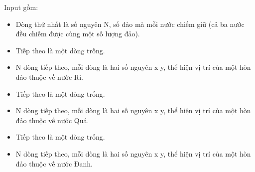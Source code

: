 Input gồm:  
\begin{itemize}
	\item     Dòng thứ nhất là số nguyên N, số đảo mà mỗi nước chiếm giữ (cả ba nước đều chiếm được cùng một số lượng đảo).   
	\item     Tiếp theo là một dòng trống.   
	\item     N dòng tiếp theo, mỗi dòng là hai số nguyên x y, thể hiện vị trí của một hòn đảo thuộc về nước Rỉ.   
	\item     Tiếp theo là một dòng trống.   
	\item     N dòng tiếp theo, mỗi dòng là hai số nguyên x y, thể hiện vị trí của một hòn đảo thuộc về nước Quá.   
	\item     Tiếp theo là một dòng trống.   
	\item     N dòng tiếp theo, mỗi dòng là hai số nguyên x y, thể hiện vị trí của một hòn đảo thuộc về nước Đanh.   
\end{itemize}